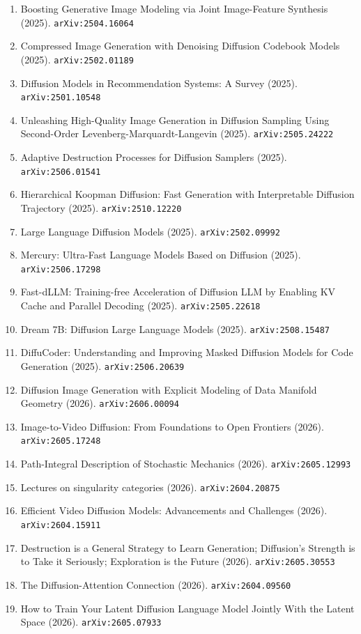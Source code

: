\documentclass[11pt]{article}
\begin{document}
\begin{enumerate}
  \item Boosting Generative Image Modeling via Joint Image-Feature Synthesis (2025). \texttt{arXiv:2504.16064}
  \item Compressed Image Generation with Denoising Diffusion Codebook Models (2025). \texttt{arXiv:2502.01189}
  \item Diffusion Models in Recommendation Systems: A Survey (2025). \texttt{arXiv:2501.10548}
  \item Unleashing High-Quality Image Generation in Diffusion Sampling Using Second-Order Levenberg-Marquardt-Langevin (2025). \texttt{arXiv:2505.24222}
  \item Adaptive Destruction Processes for Diffusion Samplers (2025). \texttt{arXiv:2506.01541}
  \item Hierarchical Koopman Diffusion: Fast Generation with Interpretable Diffusion Trajectory (2025). \texttt{arXiv:2510.12220}
  \item Large Language Diffusion Models (2025). \texttt{arXiv:2502.09992}
  \item Mercury: Ultra-Fast Language Models Based on Diffusion (2025). \texttt{arXiv:2506.17298}
  \item Fast-dLLM: Training-free Acceleration of Diffusion LLM by Enabling KV Cache and Parallel Decoding (2025). \texttt{arXiv:2505.22618}
  \item Dream 7B: Diffusion Large Language Models (2025). \texttt{arXiv:2508.15487}
  \item DiffuCoder: Understanding and Improving Masked Diffusion Models for Code Generation (2025). \texttt{arXiv:2506.20639}
  \item Diffusion Image Generation with Explicit Modeling of Data Manifold Geometry (2026). \texttt{arXiv:2606.00094}
  \item Image-to-Video Diffusion: From Foundations to Open Frontiers (2026). \texttt{arXiv:2605.17248}
  \item Path-Integral Description of Stochastic Mechanics (2026). \texttt{arXiv:2605.12993}
  \item Lectures on singularity categories (2026). \texttt{arXiv:2604.20875}
  \item Efficient Video Diffusion Models: Advancements and Challenges (2026). \texttt{arXiv:2604.15911}
  \item Destruction is a General Strategy to Learn Generation; Diffusion's Strength is to Take it Seriously; Exploration is the Future (2026). \texttt{arXiv:2605.30553}
  \item The Diffusion-Attention Connection (2026). \texttt{arXiv:2604.09560}
  \item How to Train Your Latent Diffusion Language Model Jointly With the Latent Space (2026). \texttt{arXiv:2605.07933}
\end{enumerate}
\end{document}

